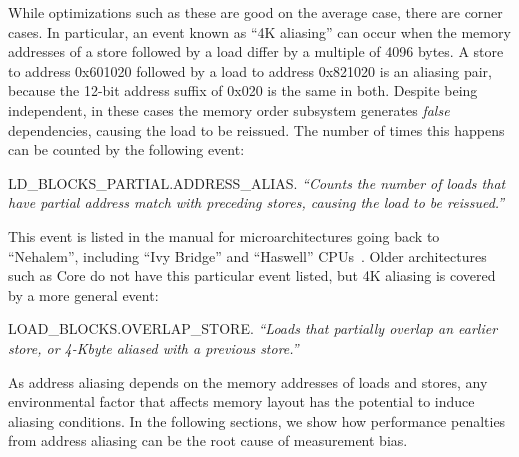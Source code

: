 \documentclass{acm_proc_article-sp}
\begin{document}
While optimizations such as these are good on the average case, there are corner cases. 
In particular, an event known as ``4K aliasing'' can occur when the memory addresses of a store followed by a load differ by a multiple of 4096 bytes.
A store to address 0x601020 followed by a load to address 0x821020 is an aliasing pair, because the 12-bit address suffix of 0x020 is the same in both. 
Despite being independent, in these cases the memory order subsystem generates \emph{false} dependencies, causing the load to be reissued.
The number of times this happens can be counted by the following event:
\begin{list}{{}}
  \item[{\small LD\_BLOCKS\_PARTIAL.ADDRESS\_ALIAS.}] \emph{``Counts the number of loads that have partial address match with preceding stores, causing the load to be reissued.''} \cite[B.3.4.4]{OptimizationManual}
\end{list}
This event is listed in the manual for microarchitectures going back to ``Nehalem'', including ``Ivy Bridge'' and ``Haswell'' CPUs~\cite{Volume3B}.
Older architectures such as Core do not have this particular event listed, but 4K aliasing is covered by a more general event:
\begin{list}{{}}
  \item[{\small LOAD\_BLOCKS.OVERLAP\_STORE.}] \emph{``Loads that partially overlap an earlier store, or 4-Kbyte aliased with a previous store.''} \cite[Table 19-17]{Volume3B}
\end{list}

As address aliasing depends on the memory addresses of loads and stores, any environmental factor that affects memory layout has the potential to induce aliasing conditions.
In the following sections, we show how performance penalties from address aliasing can be the root cause of measurement bias.
\end{document}
